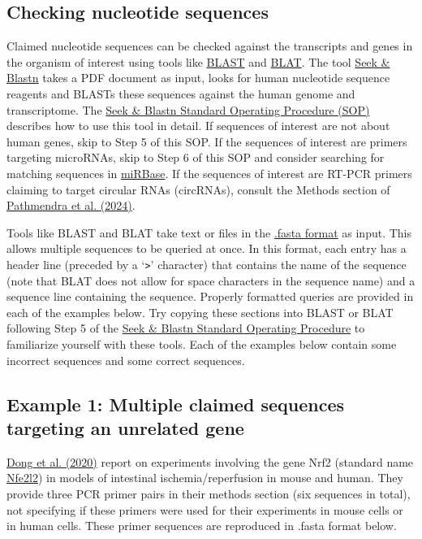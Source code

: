 \documentclass[letterpaper, 12pt]{article}
\begin{document}
\subsection*{Checking nucleotide sequences}

Claimed nucleotide sequences can be checked against the transcripts and genes in the organism of interest using tools like \href{https://blast.ncbi.nlm.nih.gov/Blast.cgi?PROGRAM=blastn}{BLAST} and \href{https://genome.ucsc.edu/cgi-bin/hgBlat}{BLAT}. The tool \href{https://scigendetection.imag.fr/TPD52/Vb/}{Seek \& Blastn} takes a PDF document as input, looks for human nucleotide sequence reagents and BLASTs these sequences against the human genome and transcriptome. The \href{https://dx.doi.org/10.17504/protocols.io.bjhpkj5n}{Seek \& Blastn Standard Operating Procedure (SOP)} describes how to use this tool in detail. If sequences of interest are not about human genes, skip to Step 5 of this SOP. If the sequences of interest are primers targeting microRNAs, skip to Step 6 of this SOP and consider searching for matching sequences in \href{https://www.mirbase.org/}{miRBase}. If the sequences of interest are RT-PCR primers claiming to target circular RNAs (circRNAs), consult the Methods section of \href{https://doi.org/10.1007/s00210-023-02846-2}{Pathmendra et al. (2024)}.

Tools like BLAST and BLAT take text or files in the \href{https://en.wikipedia.org/wiki/FASTA_format}{.fasta format} as input. This allows multiple sequences to be queried at once. In this format, each entry has a header line (preceded by a `\verb|>|' character) that contains the name of the sequence (note that BLAT does not allow for space characters in the sequence name) and a sequence line containing the sequence. Properly formatted queries are provided in each of the examples below. Try copying these sections into BLAST or BLAT following Step 5 of the \href{https://dx.doi.org/10.17504/protocols.io.bjhpkj5n}{Seek \& Blastn Standard Operating Procedure} to familiarize yourself with these tools. Each of the examples below contain some incorrect sequences and some correct sequences.

\subsection*{Example 1: Multiple claimed sequences targeting an unrelated gene}

\href{https://doi.org/10.18632/aging.103378}{Dong et al. (2020)} report on experiments involving the gene Nrf2 (standard name \href{https://www.ncbi.nlm.nih.gov/gene/18024}{Nfe2l2}) in models of intestinal ischemia/reperfusion in mouse and human. They provide three PCR primer pairs in their methods section (six sequences in total), not specifying if these primers were used for their experiments in mouse cells or in human cells. These primer sequences are reproduced in .fasta format below.
\end{document}
